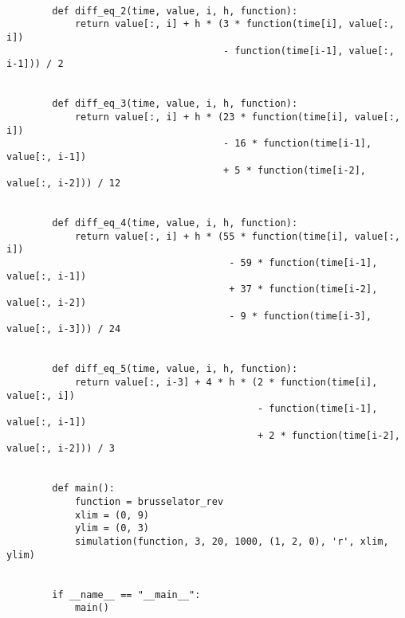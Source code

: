 \documentclass[10pt, a4paper, twoside, onecolumn]{article}
\numberwithin{equation}{section}
\begin{document}
\begin{verbatim}
		
		def diff_eq_2(time, value, i, h, function):
		    return value[:, i] + h * (3 * function(time[i], value[:, i])
		                              - function(time[i-1], value[:, i-1])) / 2
		
		
		def diff_eq_3(time, value, i, h, function):
		    return value[:, i] + h * (23 * function(time[i], value[:, i])
		                              - 16 * function(time[i-1], value[:, i-1])
		                              + 5 * function(time[i-2], value[:, i-2])) / 12
		
		
		def diff_eq_4(time, value, i, h, function):
		    return value[:, i] + h * (55 * function(time[i], value[:, i])
		                               - 59 * function(time[i-1], value[:, i-1])
		                               + 37 * function(time[i-2], value[:, i-2])
		                               - 9 * function(time[i-3], value[:, i-3])) / 24
		
		
		def diff_eq_5(time, value, i, h, function):
		    return value[:, i-3] + 4 * h * (2 * function(time[i], value[:, i])
		                                    - function(time[i-1], value[:, i-1])
		                                    + 2 * function(time[i-2], value[:, i-2])) / 3
		
		
		def main():
		    function = brusselator_rev
		    xlim = (0, 9)
		    ylim = (0, 3)
		    simulation(function, 3, 20, 1000, (1, 2, 0), 'r', xlim, ylim)


		if __name__ == "__main__":
		    main()

	\end{verbatim}
\end{document}
